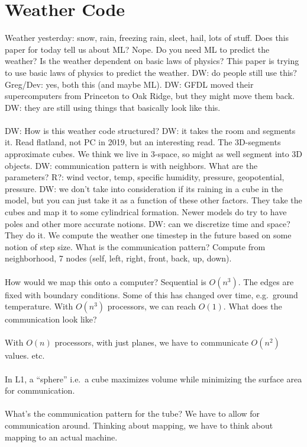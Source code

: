 \section{Weather Code}
Weather yesterday: snow, rain, freezing rain, sleet, hail, lots of stuff.
Does this paper for today tell us about ML? Nope.
Do you need ML to predict the weather?
Is the weather dependent on basic laws of physics?
This paper is trying to use basic laws of physics to predict the weather.
DW: do people still use this?
Greg/Dev: yes, both this (and maybe ML).
DW: GFDL moved their supercomputers from Princeton to Oak Ridge, but they might move them back.
DW: they are still using things that basically look like this.
\\ \\
DW: How is this weather code structured?
DW: it takes the room and segments it.
Read flatland, not PC in 2019, but an interesting read.
The 3D-segments approximate cubes.
We think we live in 3-space, so might as well segment into 3D objects.
DW: communication pattern is with neighbors.
What are the parameters?
R?: wind vector, temp, specific humidity, pressure, geopotential, pressure.
DW: we don't take into consideration if its raining in a cube in the model, but you can just take it as a function of these other factors.
They take the cubes and map it to some cylindrical formation.
Newer models do try to have poles and other more accurate notions.
DW: can we discretize time and space?
They do it.
We compute the weather one timestep in the future based on some notion of step size.
What is the communication pattern?
Compute from neighborhood, 7 nodes (self, left, right, front, back, up, down).
\\ \\
How would we map this onto a computer?
Sequential is \( O(n^3) \).
The edges are fixed with boundary conditions.
Some of this has changed over time, e.g.\ ground temperature.
With \( O(n^3) \) processors, we can reach \( O(1) \).
What does the communication look like?
\\ \\
With \( O(n) \) processors, with just planes, we have to communicate \( O(n^2) \) values.
etc.
\\ \\
In L1, a ``sphere'' i.e.\ a cube maximizes volume while minimizing the surface area for communication.
\\ \\
What's the communication pattern for the tube?
We have to allow for communication around.
Thinking about mapping, we have to think about mapping to an actual machine.
